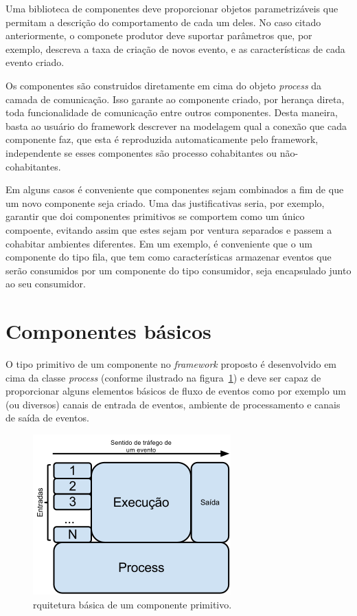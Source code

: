 Uma biblioteca de componentes deve proporcionar objetos parametrizáveis que permitam a descrição do comportamento de cada um deles. No caso citado anteriormente, o componete produtor deve suportar parâmetros que, por exemplo, descreva a taxa de criação de novos evento, e as características de cada evento criado.

Os componentes são construidos diretamente em cima do objeto \textit{process} da camada de comunicação. Isso garante ao componente criado, por herança direta, toda funcionalidade de comunicação entre outros componentes. Desta maneira, basta ao usuário do framework descrever na modelagem qual a conexão que cada componente faz, que esta é reproduzida automaticamente pelo framework, independente se esses componentes são processo cohabitantes ou não-cohabitantes.

Em alguns casos é conveniente que componentes sejam combinados a fim de que um novo componente seja criado. Uma das justificativas seria, por exemplo, garantir que doi componentes primitivos se comportem como um único compoente, evitando assim que estes sejam por ventura separados e passem a cohabitar ambientes diferentes. Em um exemplo, é conveniente que o um componente do tipo fila, que tem como características armazenar eventos que serão consumidos por um componente do tipo consumidor, seja encapsulado junto ao seu consumidor.

\section{Componentes básicos}

O tipo primitivo de um componente no \textit{framework} proposto é desenvolvido em cima da classe \textit{process} (conforme ilustrado na figura~\ref{fig:basic_component}) e deve ser capaz de proporcionar alguns elementos básicos de fluxo de eventos como por exemplo um (ou diversos) canais de entrada de eventos, ambiente de processamento e canais de saída de eventos.

\begin{figure}
  \centerline{\includegraphics{basic_component.png}}
  \caption{rquitetura básica de um componente primitivo.}
\label{fig:basic_component}
\end{figure}

